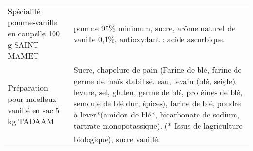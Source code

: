 \begin{longtable}{p{5cm}p{10cm}}
                                                   Spécialité pomme-vanille en coupelle 100 g SAINT MAMET &                                                                                                                                                                                                                                                                                                                                                                                                                                                                                                                                                                                                                                                                                                                                                                                                                                                                                                                                                 pomme 95\% minimum, sucre, arôme naturel de vanille 0,1\%, antioxydant : acide ascorbique. \\
                                                     Préparation pour moelleux vanillé en sac 5 kg TADAAM &                                                                                                                                                                                                                                                                                                                                                                                                                                                                                                                                                                                                                                                                                          Sucre, chapelure de pain (Farine de blé, farine de germe de maïs stabilisé, eau, levain (blé, seigle), levure, sel, gluten, germe de blé, protéines de blé, semoule de blé dur, épices), farine de blé, poudre à lever*(amidon de blé*, bicarbonate de sodium, tartrate monopotassique).  (* Issus de lagriculture biologique), sucre vanillé. \\

\end{longtable}
